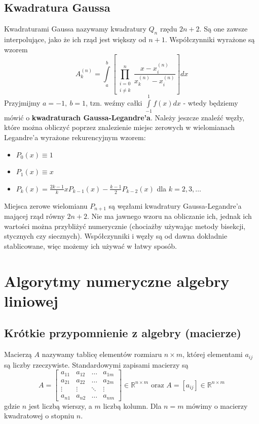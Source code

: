 \documentclass[a4paper,11pt]{article}
\begin{document}
\subsection{Kwadratura Gaussa}
Kwadraturami Gaussa nazywamy kwadratury $Q_n$ rzędu $2n+2$. Są one zawsze interpolujące, jako że ich rząd jest większy od $n+1$. Współczynniki wyrażone są wzorem
$$ A_k^{(n)} = \int\limits_{a}^{b} \left[ \prod\limits_{\substack{i=0 \\ i \neq k}}^{n} \frac{x-x_i^{(n)}}{x_k^{(n)}-x_i^{(n)}} \right] dx$$
\noindent Przyjmijmy $a=-1, \ b=1$, tzn. weźmy całki $\int\limits_{-1}^{1}f(x)dx$ - wtedy będziemy mówić o \textbf{kwadraturach Gaussa-Legandre'a}. Należy jeszcze znaleźć węzły, które można obliczyć poprzez znalezienie miejsc zerowych w wielomianach Legandre'a wyrażone rekurencyjnym wzorem:
\begin{itemize}
\item $P_0(x) \equiv 1$
\item $P_1(x) \equiv x$
\item $P_k(x) = \frac{2k-1}{k}xP_{k-1}(x)-\frac{k-1}{2}P_{k-2}(x)$ dla $k=2,3,\ldots$
\end{itemize}
Miejsca zerowe wielomianu $P_{n+1}$ są węzłami kwadratury Gaussa-Legandre'a mającej rząd równy $2n+2$. Nie ma jawnego wzoru na obliczanie ich, jednak ich wartości można przybliżyć numerycznie (chociażby używając metody bisekcji, stycznych czy siecznych). Współczynniki i węzły są od dawna dokładnie stablicowane, więc możemy ich używać w łatwy sposób.


\clearpage
\section{Algorytmy numeryczne algebry liniowej}

\subsection{Krótkie przypomnienie z algebry (macierze)}
Macierzą $A$ nazywamy tablicę elementów rozmiaru $n \times m$, której elementami $a_{ij}$ są liczby rzeczywiste. Standardowymi zapisami macierzy są
$$
A = \left[
\begin{array}{cccc}
a_{11}	& 	a_{12}	& 	\ldots 		& a_{1m} \\
a_{21}	& 	a_{22}	& 	\ldots 		& a_{2m} \\
\vdots 	& 	\vdots		& 	\ddots		& \vdots \\
a_{n1}	& 	a_{n2}	& 	\ldots 		& a_{nm} 
\end{array}
\right] \in \mathbb{R}^{n\times m} \text{ oraz } A = \left[ a_{ij} \right] \in \mathbb{R}^{n\times m}
$$
\noindent gdzie $n$ jest liczbą wierszy, a $m$ liczbą kolumn. Dla $n=m$ mówimy o macierzy kwadratowej o stopniu $n$.
\end{document}
